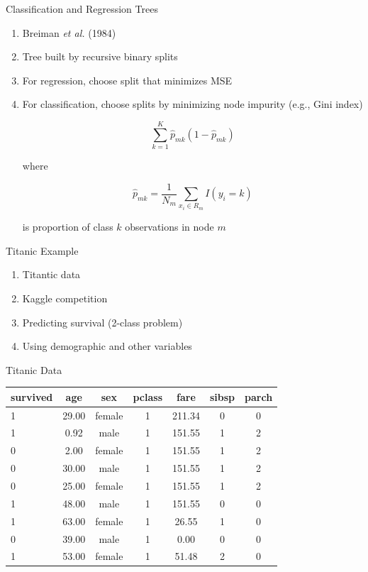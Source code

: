 \documentclass[pdf]{beamer}
\begin{document}
		\begin{frame}{Classification and Regression Trees}
			\begin{enumerate}
				\item Breiman \textit{et al.} (1984)
				\item Tree built by recursive binary splits 
				\item For regression, choose split that minimizes MSE
				\item For classification, choose splits by minimizing node impurity (e.g., Gini index) \\
				\begin{center}
					$$\sum_{k = 1}^{K} \hat{p}_{mk}(1 - \hat{p}_{mk})$$
				\end{center}
				where \\
				\begin{center}
					$$ \hat{p}_{mk} = \frac{1}{N_m} \sum_{x_i \in R_m} I(y_i = k)$$
				\end{center}
				is proportion of class $k$ observations in node $m$		
			\end{enumerate}
		\end{frame}

		
		\begin{frame}{Titanic Example}
			\begin{enumerate}
				\item Titantic data
				\item Kaggle competition
				\item Predicting survival (2-class problem)
				\item Using demographic and other variables
			\end{enumerate}
		\end{frame}
		
		
		
		\begin{frame}{Titanic Data}
		\begin{table}
		\begin{tabular}{l c c c c c c}
			\hline
			survived & age & sex & pclass & fare & sibsp & parch \\
			\hline
			1 	& 29.00 	& female	& 1	& 211.34	& 0	& 0 \\
			1 	& 0.92 	& male	& 1	& 151.55	& 1	& 2 \\
			0	& 2.00	& female	& 1	& 151.55	& 1	& 2 \\
			0 	& 30.00 	& male	& 1	& 151.55	& 1	& 2 \\
			0	& 25.00	& female	& 1	& 151.55	& 1	& 2 \\
			1 	& 48.00 	& male	& 1	& 151.55	& 0	& 0 \\
			1	& 63.00	& female	& 1	& 26.55	& 1	& 0 \\
			0	& 39.00	& male	& 1	& 0.00	& 0	& 0 \\
			1 	& 53.00 	& female	& 1	& 51.48	& 2	& 0 \\
			\hline
		\end{tabular}
		\end{table}
		\end{frame}
		
\end{document}
